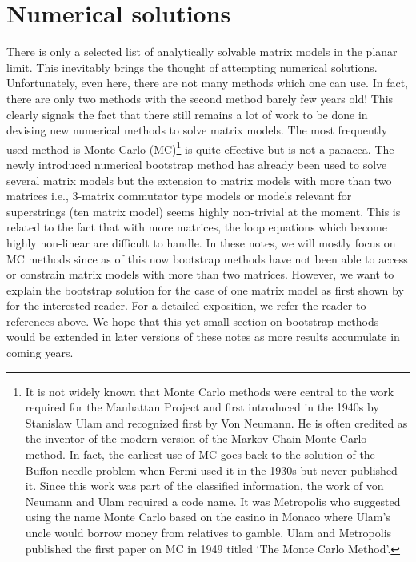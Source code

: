 \documentclass[11pt]{article}
\begin{document}
\section{\label{sec:NSOL}Numerical solutions} 
There is only a selected list of analytically solvable matrix models in the planar limit. This inevitably brings 
the thought of attempting numerical solutions. Unfortunately, even here, there are not many methods 
which one can use. In fact, there are only two methods with the second method barely few years old! 
This clearly signals the fact that there still remains a lot of work to be done in devising new numerical 
methods to solve matrix models. The most frequently used method is Monte Carlo (MC)\footnote{
It is not widely known that Monte Carlo methods were central to the work required for the Manhattan Project
and first introduced in the 1940s by Stanislaw Ulam and recognized first by Von Neumann. 
He is often credited as the inventor of the modern version of the Markov Chain Monte Carlo 
method. In fact, the earliest use of MC goes back to the solution of the Buffon needle problem when Fermi used it in the 
1930s but never published it. 
Since this work was part of the classified information, the work of von Neumann and Ulam required a code name. It was Metropolis who 
suggested using the name Monte Carlo based on the casino in 
Monaco where Ulam's uncle would borrow money from relatives to gamble. Ulam and Metropolis
published the first paper on MC in 1949 titled `The Monte Carlo Method'.} 
is quite effective but is not a panacea. 
The newly introduced numerical bootstrap method has already been used to solve several matrix models \cite{Anderson:2016rcw,Lin:2020mme,Han:2020bkb,Kazakov:2021lel} but the extension to matrix models with more than two matrices i.e., 3-matrix commutator type models or  models relevant for superstrings (ten matrix model) seems highly non-trivial at the moment. This is related to the fact that with more matrices, the loop equations which become highly non-linear are difficult to handle. In these notes, we will mostly focus on MC methods since as of this now bootstrap methods have not been able to access or constrain matrix models with more than two matrices. However, we want to explain the bootstrap solution for the case of one matrix model as first shown by \cite{Lin:2020mme} for the interested reader. For a detailed exposition, we refer the reader to references above. 
We hope that this yet small section on bootstrap methods would be extended in later versions 
of these notes as more results accumulate in coming years. 
\end{document}
